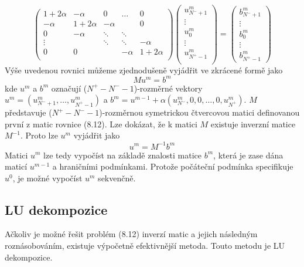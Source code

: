 \documentclass[a4paper]{book}
\begin{document}
\begin{equation*}
	\begin{pmatrix}
		1 + 2 \alpha & - \alpha & 0 & \dots & 0 \\
		-\alpha & 1 + 2 \alpha & - \alpha & & 0\\
		0 & -\alpha & \ddots & \ddots & \\
		\vdots & & \ddots & \ddots & -\alpha \\
		0 & 0 & & -\alpha & 1 + 2 \alpha \\
		\end{pmatrix}
	\begin{pmatrix}
		u_{N^{-}+1}^m \\
		\vdots \\
		u_0^m \\
		\vdots \\
		u_{N^{+}-1}^m \\
	\end{pmatrix}
	=
	\begin{pmatrix}
		b_{N^{-} + 1}^m \\
		\vdots \\
		b_0^m \\
		\vdots \\
		b_{N^{+} - 1}^m
	\end{pmatrix}
\end{equation*}
Výše uvedenou rovnici můžeme zjednodušeně vyjádřit ve zkrácené formě jako
\begin{equation}
Mu^m = b^m
\end{equation}
kde $u^m$ a $b^m$ označují ($N^{+} - N^{-} - 1$)-rozměrné vektory $u^m = (u_{N^{-} + 1}^m, \dots, u_{N^{+} - 1}^m)$ a $b^m = u^{m-1} + \alpha(u_{N^{-}}^m, 0, 0, \dots, 0, u_{N^{+}}^m)$. $M$ představuje ($N^{+} - N^{-} - 1$)-rozměrnou symetrickou čtvercovou matici definovanou první z matic rovnice (8.12). Lze dokázat, že k matici $M$ existuje inverzní matice $M^{-1}$. Proto lze $u^m$ vyjádřit jako
\begin{equation*}
u^m = M^{-1} b^m
\end{equation*}
Matici $u^m$ lze tedy vypočíst na základě znalosti matice $b^m$, která je zase dána maticí $u^{m-1}$ a hraničními podmínkami. Protože počáteční podmínka specifikuje $u^0$, je možné vypočíst $u^m$ sekvenčně.

\subsection{LU dekompozice}

Ačkoliv je možné řešit problém (8.12) inverzí matic a jejich následným roznásobováním, existuje výpočetně efektivnější metoda. Touto metodu je LU dekompozice.
\end{document}
